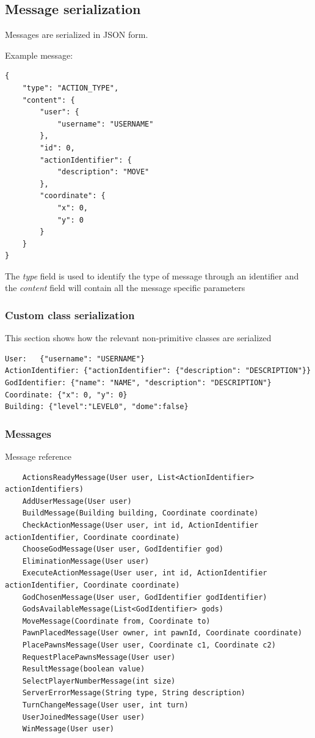 \documentclass{article}
\begin{document}
\subsection*{Message serialization}

Messages are serialized in JSON form.

\vspace{8pt}

Example message:
\begin{lstlisting}
{
    "type": "ACTION_TYPE",
    "content": {
        "user": {
            "username": "USERNAME"
        },
        "id": 0,
        "actionIdentifier": {
            "description": "MOVE"
        },
        "coordinate": {
            "x": 0,
            "y": 0
        }
    }
}
\end{lstlisting}

The \emph{type} field is used to identify the type of message through an identifier and the \emph{content} field will contain all the message specific parameters

\subsubsection*{Custom class serialization}

This section shows how the relevant non-primitive classes are serialized
\begin{lstlisting}
User:	{"username": "USERNAME"}
ActionIdentifier: {"actionIdentifier": {"description": "DESCRIPTION"}}
GodIdentifier: {"name": "NAME", "description": "DESCRIPTION"}
Coordinate: {"x": 0, "y": 0}
Building: {"level":"LEVEL0", "dome":false}
\end{lstlisting}

\subsubsection*{Messages}
Message reference
\begin{lstlisting}
    ActionsReadyMessage(User user, List<ActionIdentifier> actionIdentifiers)
    AddUserMessage(User user)
    BuildMessage(Building building, Coordinate coordinate)
    CheckActionMessage(User user, int id, ActionIdentifier actionIdentifier, Coordinate coordinate)
    ChooseGodMessage(User user, GodIdentifier god)
    EliminationMessage(User user)
    ExecuteActionMessage(User user, int id, ActionIdentifier actionIdentifier, Coordinate coordinate)
    GodChosenMessage(User user, GodIdentifier godIdentifier)
    GodsAvailableMessage(List<GodIdentifier> gods)
    MoveMessage(Coordinate from, Coordinate to)
    PawnPlacedMessage(User owner, int pawnId, Coordinate coordinate)
    PlacePawnsMessage(User user, Coordinate c1, Coordinate c2)
    RequestPlacePawnsMessage(User user)
    ResultMessage(boolean value)
    SelectPlayerNumberMessage(int size)
    ServerErrorMessage(String type, String description)
    TurnChangeMessage(User user, int turn)
    UserJoinedMessage(User user)
    WinMessage(User user)
\end{lstlisting}
\end{document}
